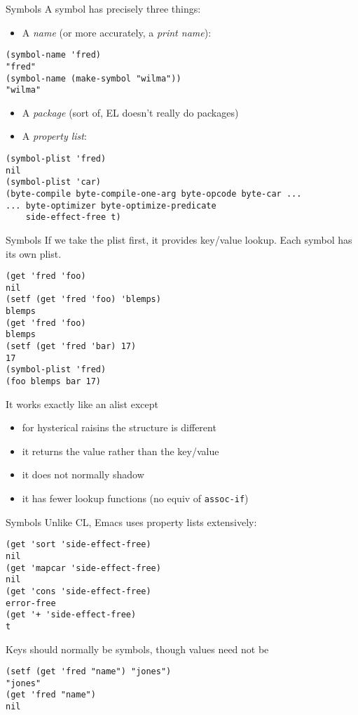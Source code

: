 \documentclass[presentation]{beamer}
\begin{document}
\begin{frame}[fragile]{Symbols}
  A symbol has precisely three things:
  \begin{itemize}
  \item A \emph{name} (or more accurately, a \emph{print name}):
  \end{itemize}
\begin{verbatim}
(symbol-name 'fred)
"fred"
(symbol-name (make-symbol "wilma"))
"wilma"
\end{verbatim}
\begin{itemize}
\item A \emph{package} (sort of, EL doesn't really do packages)
\item A \emph{property list}:
\end{itemize}
\begin{verbatim}
(symbol-plist 'fred)
nil
(symbol-plist 'car)
(byte-compile byte-compile-one-arg byte-opcode byte-car ...
... byte-optimizer byte-optimize-predicate
    side-effect-free t)
\end{verbatim}
\end{frame}

\begin{frame}[fragile]{Symbols}
If we take the plist first, it provides key/value lookup.  Each symbol has its own plist.
\begin{verbatim}
(get 'fred 'foo)
nil
(setf (get 'fred 'foo) 'blemps)
blemps
(get 'fred 'foo)
blemps
(setf (get 'fred 'bar) 17)
17
(symbol-plist 'fred)
(foo blemps bar 17)
\end{verbatim}
It works exactly like an alist except
\begin{itemize}
\item for hysterical raisins the structure is different
\item it returns the value rather than the key/value
\item it does not normally shadow
\item it has fewer lookup functions (no equiv of \texttt{assoc-if})
\end{itemize}
\end{frame}

\begin{frame}[fragile]{Symbols}
Unlike CL, Emacs uses property lists extensively:
\begin{verbatim}
(get 'sort 'side-effect-free)
nil
(get 'mapcar 'side-effect-free)
nil
(get 'cons 'side-effect-free)
error-free
(get '+ 'side-effect-free)
t
\end{verbatim}
Keys should normally be symbols, though values need not be
\begin{verbatim}
(setf (get 'fred "name") "jones")
"jones"
(get 'fred "name")
nil
\end{verbatim}
\end{frame}
\end{document}
